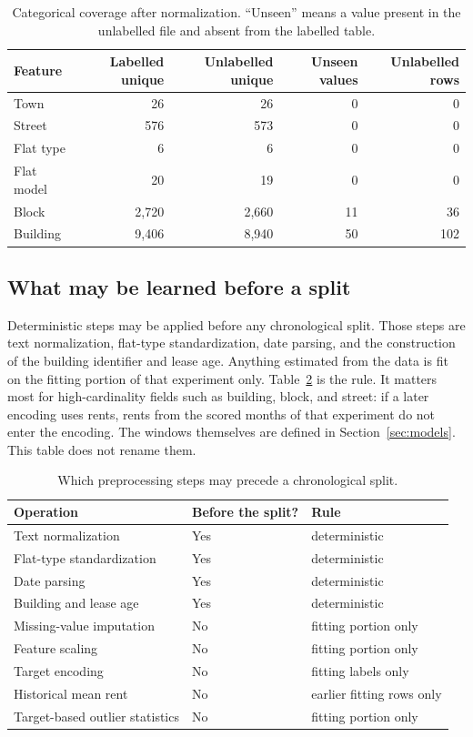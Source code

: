 \documentclass[11pt,a4paper]{article}
\begin{document}
\begin{table}[htbp]
\centering
\caption{Categorical coverage after normalization.
``Unseen'' means a value present in the unlabelled file and absent from the labelled table.}
\label{tab:train-test-category-coverage}
\small
\setlength{\tabcolsep}{4pt}
\begin{tabular}{lrrrr}
\toprule
Feature & Labelled unique & Unlabelled unique & Unseen values & Unlabelled rows \\
\midrule
Town & 26 & 26 & 0 & 0 \\
Street & 576 & 573 & 0 & 0 \\
Flat type & 6 & 6 & 0 & 0 \\
Flat model & 20 & 19 & 0 & 0 \\
Block & 2{,}720 & 2{,}660 & 11 & 36 \\
Building & 9{,}406 & 8{,}940 & 50 & 102 \\
\bottomrule
\end{tabular}
\end{table}

\subsection{What may be learned before a split}

Deterministic steps may be applied before any chronological split.
Those steps are text normalization, flat-type standardization, date parsing, and the construction of the building identifier and lease age.
Anything estimated from the data is fit on the fitting portion of that experiment only.
Table~\ref{tab:preprocessing-leakage} is the rule.
It matters most for high-cardinality fields such as building, block, and street: if a later encoding uses rents, rents from the scored months of that experiment do not enter the encoding.
The windows themselves are defined in Section~\ref{sec:models}.
This table does not rename them.

\begin{table}[htbp]
\centering
\caption{Which preprocessing steps may precede a chronological split.}
\label{tab:preprocessing-leakage}
\small
\begin{tabular}{lll}
\toprule
Operation & Before the split? & Rule \\
\midrule
Text normalization & Yes & deterministic \\
Flat-type standardization & Yes & deterministic \\
Date parsing & Yes & deterministic \\
Building and lease age & Yes & deterministic \\
Missing-value imputation & No & fitting portion only \\
Feature scaling & No & fitting portion only \\
Target encoding & No & fitting labels only \\
Historical mean rent & No & earlier fitting rows only \\
Target-based outlier statistics & No & fitting portion only \\
\bottomrule
\end{tabular}
\end{table}
\end{document}
